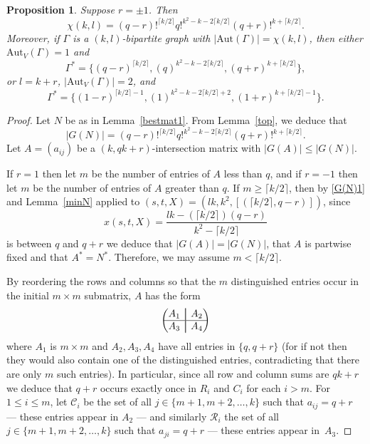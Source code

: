 \documentclass{daj}
\newcommand\Aut{\mathrm{Aut}}
\newcommand\aug{\fboxsep=-\fboxrule\!\!\!\fbox{\strut}\!\!\!}
\theoremstyle{plain}
\newtheorem{proposition}[theorem]{Proposition}
\theoremstyle{definition}
\begin{document}
\begin{proposition}\label{1}
Suppose $r=\pm1$. Then $$\chi(k,l)=(q-r)!^{\lceil k/2\rceil}q!^{k^2-k-2\lceil k/2\rceil}(q+r)!^{k+\lceil k/2\rceil}.$$ Moreover, if $\Gamma$ is a $(k,l)$-bipartite graph with $|\Aut(\Gamma)|=\chi(k,l)$, then either $\Aut_V(\Gamma)=1$ and $$\Gamma^*=\{(q-r)^{\lceil k/2\rceil},(q)^{k^2-k-2\lceil k/2\rceil},(q+r)^{k+\lceil k/2\rceil}\},$$ or $l=k+r$, $|\Aut_V(\Gamma)|=2$, and $$\Gamma^*=\{(1-r)^{\lceil k/2\rceil-1},(1)^{k^2-k-2\lceil k/2\rceil+2},(1+r)^{k+\lceil k/2\rceil-1}\}.$$
\end{proposition}
\begin{proof}
Let $N$ be as in Lemma~\ref{bestmat1}. From Lemma~\ref{top}, we deduce that \begin{equation}\label{G(N)1}|G(N)|=(q-r)!^{\lceil k/2\rceil}q!^{k^2-k-2\lceil k/2\rceil}(q+r)!^{k+\lceil k/2\rceil}.\end{equation} 
Let $A=(a_{ij})$ be a $(k,qk+r)$-intersection matrix with $|G(A)|\leq |G(N)|$. 

If $r=1$ then let $m$ be the number of entries of $A$ less than $q$, and if $r=-1$ then let $m$ be the number of entries of $A$ greater than $q$. If $m\geq\lceil k/2\rceil$, then by \eqref{G(N)1} and Lemma~\ref{minN} applied to $(s,t,X)=(lk,k^2,[(\lceil k/2\rceil,q-r)])$, since $$ x(s,t,X)=\frac{lk-(\lceil k/2\rceil)(q-r)}{k^2-\lceil k/2\rceil}$$ is between $q$ and $q+r$ we deduce that $|G(A)|=|G(N)|$, that $A$ is partwise fixed and that $A^*=N^*$. Therefore, we may assume $m<\lceil k/2\rceil$.

By reordering the rows and columns so that the $m$ distinguished entries occur in the initial $m\times m$ submatrix, $A$ has the form
$$\begin{pmatrix}
A_1&\aug&A_2\\\hline
A_3&\aug&A_4\\
\end{pmatrix}$$
where $A_1$ is $m\times m$ and $A_2,A_3,A_4$ have all entries in $\{q,q+r\}$  (for if not then they would also contain one of the distinguished entries, contradicting that there are only $m$ such entries). In particular, since all row and column sums are $qk+r$ we deduce that $q+r$ occurs exactly once in $R_i$ and $C_i$ for each $i>m$. For $1\leq i\leq m$, let $\mathcal{C}_i$ 
 be the set of all $j\in \{m+1,m+2,\dots, k\}$ such that $a_{ij}=q+r$ --- these entries appear in $A_2$ --- and similarly $\mathcal{R}_i$ 
 the set of all $ j\in \{m+1,m+2,\dots, k\}$ such that $a_{ji}=q+r$ --- these entries appear in~$A_3$. 


\end{proof}
\end{document}
